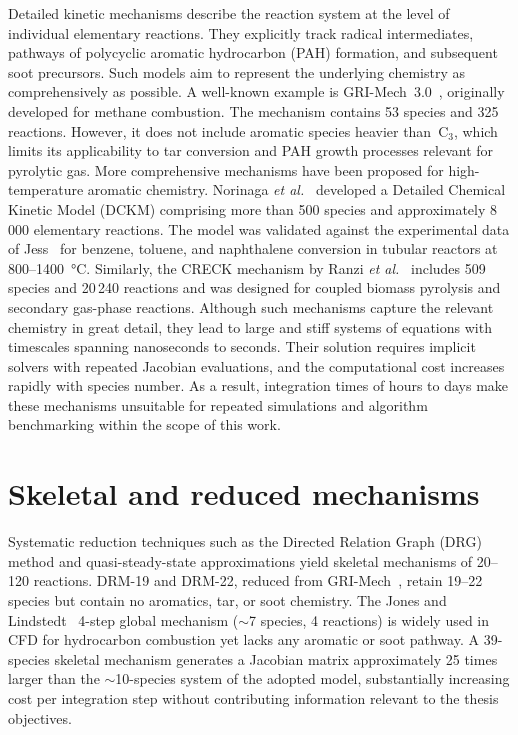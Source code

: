 Detailed kinetic mechanisms describe the reaction system at the level of individual elementary reactions. They explicitly track radical intermediates, pathways of polycyclic aromatic hydrocarbon (PAH) formation, and subsequent soot precursors. Such models aim to represent the underlying chemistry as comprehensively as possible. A well-known example is GRI-Mech~3.0~\cite{GRIMech}, originally developed for methane combustion. The mechanism contains 53 species and 325 reactions. However, it does not include aromatic species heavier than~\(\mathrm{C_3}\), which limits its applicability to tar conversion and PAH growth processes relevant for pyrolytic gas. More comprehensive mechanisms have been proposed for high-temperature aromatic chemistry. Norinaga \textit{et al.}~\cite{Norinaga2011} developed a Detailed Chemical Kinetic Model (DCKM) comprising more than 500 species and approximately 8\,000 elementary reactions. The model was validated against the experimental data of Jess~\cite{Jess1996} for benzene, toluene, and naphthalene conversion in tubular reactors at 800--1400~\si{\degreeCelsius}. Similarly, the CRECK mechanism by Ranzi \textit{et al.}~\cite{Ranzi2014} includes 509 species and 20\,240 reactions and was designed for coupled biomass pyrolysis and secondary gas-phase reactions. Although such mechanisms capture the relevant chemistry in great detail, they lead to large and stiff systems of equations with timescales spanning nanoseconds to seconds. Their solution requires implicit solvers with repeated Jacobian evaluations, and the computational cost increases rapidly with species number. As a result, integration times of hours to days make these mechanisms unsuitable for repeated simulations and algorithm benchmarking within the scope of this work.

\section{Skeletal and reduced mechanisms}\label{sec:skeletal_mechanisms}

Systematic reduction techniques such as the Directed Relation Graph (DRG) method and quasi-steady-state approximations yield skeletal mechanisms of 20--120 reactions. DRM-19 and DRM-22, reduced from GRI-Mech~\cite{GRIMech}, retain 19--22 species but contain no aromatics, tar, or soot chemistry. The Jones and Lindstedt~\cite{JonesLindstedt1988} 4-step global mechanism (\(\sim\)7 species, 4 reactions) is widely used in CFD for hydrocarbon combustion yet lacks any aromatic or soot pathway. A 39-species skeletal mechanism generates a Jacobian matrix approximately 25 times larger than the \(\sim\)10-species system of the adopted model, substantially increasing cost per integration step without contributing information relevant to the thesis objectives.

